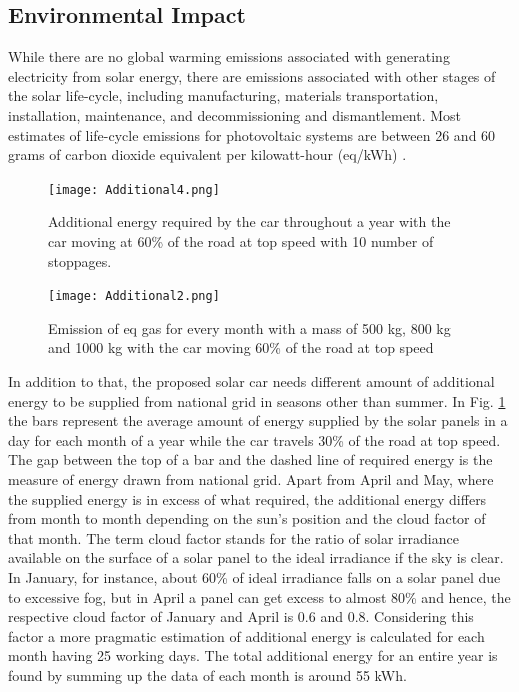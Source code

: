 \documentclass[journal]{IEEEtran/IEEEtran}
\newcommand{\figref}[1]{Fig. \ref{#1}}
\begin{document}
	\subsection{Environmental Impact}
	While there are no global warming emissions associated with generating electricity from solar energy, there are emissions associated with other stages of the solar life-cycle, including manufacturing, materials transportation, installation, maintenance, and decommissioning and dismantlement. Most estimates of life-cycle emissions for photovoltaic systems are between 26 and 60 grams of carbon dioxide equivalent per kilowatt-hour (eq/kWh) \cite{greenhous}.
	
	\begin{figure}[!b]
		\centering
		\texttt{[image: Additional4.png]}
		\caption{Additional energy required by the car throughout a year with the car moving at 60\% of the road at top speed with 10 number of stoppages.}
		\label{fig:additionalenv}
	\end{figure}
	
	\begin{figure}[!b]
		\centering
		\texttt{[image: Additional2.png]}
		\caption{Emission of eq gas for every month with a mass of 500 kg, 800 kg and 1000 kg with the car moving 60\% of the road at top speed}
		\label{fig:withmass}
	\end{figure}
	
	In addition to that, the proposed solar car needs different amount of additional energy to be supplied from national grid in seasons other than summer. In \figref{fig:additionalenv} the bars represent the average amount of energy supplied by the solar panels in a day for each month of a year while the car travels 30\% of the road at top speed. The gap between the top of a bar and the dashed line of required energy is the measure of energy drawn from national grid. Apart from April and May, where the supplied energy is in excess of what required, the additional energy differs from month to month depending on the sun's position and the cloud factor of that month. The term cloud factor stands for the ratio of solar irradiance available on the surface of a solar panel to the ideal irradiance if the sky is clear. In January, for instance, about 60\% of ideal irradiance falls on a solar panel due to excessive fog, but in April a panel can get excess to almost 80\% and hence, the respective cloud factor of January and April is 0.6 and 0.8. Considering this factor a more pragmatic estimation of additional energy is calculated for each month having 25 working days. The total additional energy for an entire year is found by summing up the data of each month is around 55 kWh.
	
\end{document}
